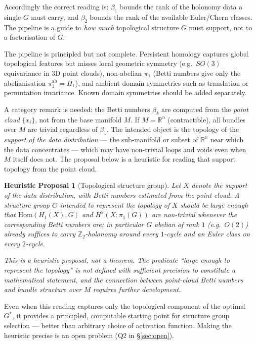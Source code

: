 \documentclass[11pt, a4paper]{article}
\theoremstyle{plain}
\newtheorem{heuristic}[theorem]{Heuristic Proposal}
\theoremstyle{definition}
\newcommand{\R}{\mathbb{R}}
\begin{document}
Accordingly the correct reading is: $\beta_1$ bounds the rank of the holonomy
data a single $G$ must carry, and $\beta_2$ bounds the rank of the available
Euler/Chern classes. The pipeline is a guide to \emph{how much} topological
structure $G$ must support, not to a factorisation of $G$.

The pipeline is principled but not complete. Persistent homology captures global
topological features but misses local geometric symmetry (e.g.\ $SO(3)$
equivariance in 3D point clouds), non-abelian $\pi_1$ (Betti numbers give only the
abelianisation $\pi_1^{\mathrm{ab}} = H_1$), and ambient domain symmetries such
as translation or permutation invariance. Known domain symmetries should be
added separately.

A category remark is needed: the Betti numbers $\beta_k$ are computed from the
\emph{point cloud} $\{x_i\}$, not from the base manifold $M$. If $M = \R^n$
(contractible), all bundles over $M$ are trivial regardless of $\beta_1$.
The intended object is the topology of the \emph{support of the data
distribution} --- the sub-manifold or subset of $\R^n$ near which the data
concentrates --- which may have non-trivial loops and voids even when $M$ itself
does not. The proposal below is a heuristic for reading that support topology
from the point cloud.

\begin{heuristic}[Topological structure group]\label{prop:tda-lower}
Let $X$ denote the support of the data distribution, with Betti numbers
estimated from the point cloud. A structure group $G$ intended to represent the
topology of $X$ should be large enough that
$\mathrm{Hom}(H_1(X), G)$ and $H^2(X; \pi_1(G))$ are non-trivial whenever the
corresponding Betti numbers are; in particular $G$ abelian of rank $1$
(e.g.\ $O(2)$) already suffices to carry $\mathbb{Z}_2$-holonomy around every
$1$-cycle and an Euler class on every $2$-cycle.

This is a heuristic proposal, not a theorem. The predicate ``large enough to
represent the topology'' is not defined with sufficient precision to constitute
a mathematical statement, and the connection between point-cloud Betti numbers
and bundle structure over $M$ requires further development.
\end{heuristic}

Even when this reading captures only the topological component of the optimal
$G^*$, it provides a principled, computable starting point for structure group
selection --- better than arbitrary choice of activation function. Making the
heuristic precise is an open problem (Q2 in \S\ref{sec:open}).
\end{document}
